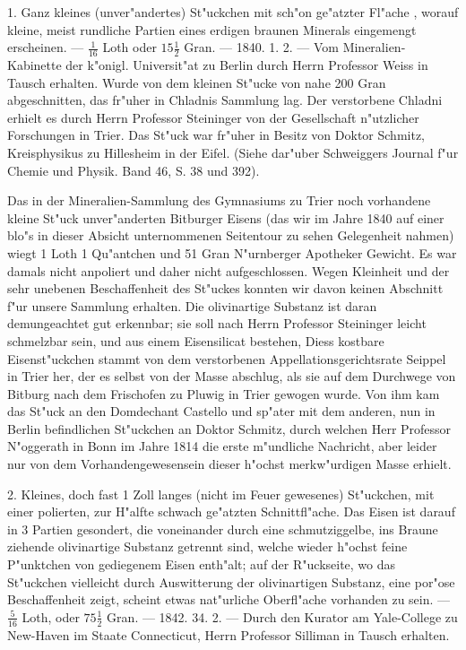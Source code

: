 \documentclass[a4paper, 11pt, oneside, polutonikogreek, german]{article}
\begin{document}
1. Ganz kleines (unver"andertes) St"uckchen mit sch"on ge"atzter Fl"ache , worauf kleine, meist rundliche Partien eines erdigen braunen Minerals eingemengt erscheinen. --- $\frac{1}{16}$ Loth oder $15\frac{1}{2}$ Gran. --- 1840. 1. 2. --- Vom Mineralien-Kabinette der k"onigl. Universit"at zu Berlin durch Herrn Professor Weiss in Tausch erhalten. Wurde von dem kleinen St"ucke von nahe 200 Gran abgeschnitten, das fr"uher in Chladnis Sammlung lag. Der verstorbene Chladni erhielt es durch Herrn Professor Steininger von der Gesellschaft n"utzlicher Forschungen in Trier. Das St"uck war fr"uher in Besitz von Doktor Schmitz, Kreisphysikus zu Hillesheim in der Eifel. (Siehe dar"uber Schweiggers Journal f"ur Chemie und Physik. Band 46, S. 38 und 392).

Das in der Mineralien-Sammlung des Gymnasiums zu Trier noch vorhandene kleine St"uck unver"anderten Bitburger Eisens (das wir im Jahre 1840 auf einer blo"s in dieser Absicht unternommenen Seitentour zu sehen Gelegenheit nahmen) wiegt 1 Loth 1 Qu"antchen und 51 Gran N"urnberger Apotheker Gewicht. Es war damals nicht anpoliert und daher nicht aufgeschlossen. Wegen Kleinheit und der sehr unebenen Beschaffenheit des St"uckes konnten wir davon keinen Abschnitt f"ur unsere Sammlung erhalten. Die olivinartige Substanz ist daran demungeachtet gut erkennbar; sie soll nach Herrn Professor Steininger leicht schmelzbar sein, und aus einem Eisensilicat bestehen, Diess kostbare Eisenst"uckchen stammt von dem verstorbenen Appellationsgerichtsrate Seippel in Trier her, der es selbst von der Masse abschlug, als sie auf dem Durchwege von Bitburg nach dem Frischofen zu Pluwig in Trier gewogen wurde. Von ihm kam das St"uck an den Domdechant Castello und sp"ater mit dem anderen, nun in Berlin befindlichen St"uckchen an Doktor Schmitz, durch welchen Herr Professor N"oggerath in Bonn im Jahre 1814 die erste m"undliche Nachricht, aber leider nur von dem Vorhandengewesensein dieser h"ochst merkw"urdigen Masse erhielt.

2. Kleines, doch fast 1 Zoll langes (nicht im Feuer gewesenes) St"uckchen, mit einer polierten, zur H"alfte schwach ge"atzten Schnittfl"ache. Das Eisen ist darauf in 3 Partien gesondert, die voneinander durch eine schmutziggelbe, ins Braune ziehende olivinartige Substanz getrennt sind, welche wieder h"ochst feine P"unktchen von gediegenem Eisen enth"alt; auf der R"uckseite, wo das St"uckchen vielleicht durch Auswitterung der olivinartigen Substanz, eine por"ose Beschaffenheit zeigt, scheint etwas nat"urliche Oberfl"ache vorhanden zu sein. --- $\frac{5}{16}$ Loth, oder $75\frac{1}{2}$ Gran. --- 1842. 34. 2. --- Durch den Kurator am Yale-College zu New-Haven im Staate Connecticut, Herrn Professor Silliman in Tausch erhalten.
\end{document}
